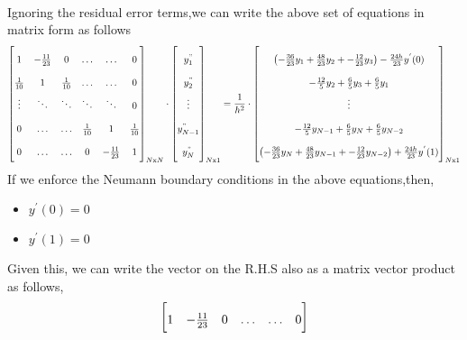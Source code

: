 \documentclass[letterpaper]{exam}
\begin{document}
\begin{questions}
\begin{parts}
\begin{solution}
\begin{align*}
\end{align*}
Ignoring the residual error terms,we can write the above set of equations in matrix form as follows\\
\begin{align*}
    \renewcommand{\arraystretch}{2}
    \begin{bmatrix}
    1&-\frac{11}{23}&0&\ldots&\ldots&0\\
    \frac{1}{10}&1&\frac{1}{10}&\ldots&\ldots&0\\
    \vdots&\ddots&\ddots&\ddots&\ddots&0\\
    0&\ldots&\ldots&\frac{1}{10}&1&\frac{1}{10}\\
    0&\ldots&\ldots&0&-\frac{11}{23}&1
    \end{bmatrix}_{N\text{x}N}\cdot \begin{bmatrix}
    y^{"}_1\\
    y^{"}_2\\
    \vdots\\
    y^{"}_{N-1}\\
    y^{"}_{N}\\
    \end{bmatrix}_{N\text{x}1} = \frac{1}{h^2}\cdot \begin{bmatrix}
    \left(-\frac{36}{23}y_{1} + \frac{48}{23}y_{2} + -\frac{12}{23}y_{3}\right) - \frac{24h}{23}y^{'}(0)\\
    -\frac{12}{5}y_2 + \frac{6}{5}y_{3} + \frac{6}{5}y_{1}\\
    \vdots\\
    -\frac{12}{5}y_{N-1} + \frac{6}{5}y_{N} + \frac{6}{5}y_{N-2}\\
    \left(-\frac{36}{23}y_{N} + \frac{48}{23}y_{N-1} + -\frac{12}{23}y_{N-2}\right) + \frac{24h}{23}y^{'}(1)\\
    \end{bmatrix}_{N\text{x}1}
\end{align*}
If we enforce the Neumann boundary conditions in the above equations,then,
\begin{itemize}
    \item $y^{'}(0) = 0$
    \item $y^{'}(1) = 0$
\end{itemize}
Given this, we can write the vector on the R.H.S also as a matrix vector product as follows,
\begin{align}\label{6}
  \renewcommand{\arraystretch}{2}
    \begin{bmatrix}
    1&-\frac{11}{23}&0&\ldots&\ldots&0\\

\end{bmatrix}
\end{align}
\end{solution}
\end{parts}
\end{questions}
\end{document}

